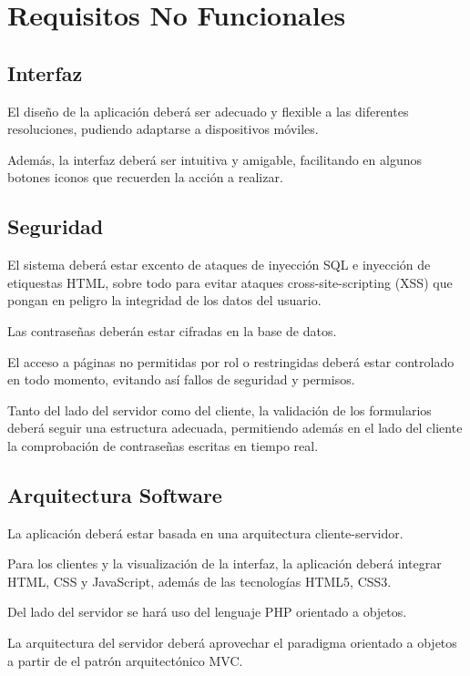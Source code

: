 \chapter{Requisitos No Funcionales}


\section{Interfaz}

El dise\~{n}o de la aplicaci\'{o}n deber\'{a} ser adecuado y flexible a las diferentes resoluciones, pudiendo adaptarse a dispositivos m\'{o}viles.

Adem\'{a}s, la interfaz deber\'{a} ser intuitiva y amigable, facilitando en algunos botones iconos que recuerden la acci\'{o}n a realizar.


\section{Seguridad}

El sistema deber\'{a} estar excento de ataques de inyecci\'{o}n SQL e inyecci\'{o}n de etiquestas HTML, sobre todo para evitar ataques cross-site-scripting (XSS) que pongan en peligro la integridad de los datos del usuario.

Las contrase\~{n}as deber\'{a}n estar cifradas en la base de datos.

El acceso a p\'{a}ginas no permitidas por rol o restringidas deber\'{a} estar controlado en todo momento, evitando as\'{i} fallos de seguridad y permisos.

Tanto del lado del servidor como del cliente, la validaci\'{o}n de los formularios deber\'{a} seguir una estructura adecuada, permitiendo adem\'{a}s en el lado del cliente la comprobaci\'{o}n de contrase\~{n}as escritas en tiempo real.


\section{Arquitectura Software}

La aplicaci\'{o}n deber\'{a} estar basada en una arquitectura cliente-servidor.

Para los clientes y la visualizaci\'{o}n de la interfaz, la aplicaci\'{o}n deber\'{a} integrar HTML, CSS y JavaScript, adem\'{a}s de las tecnolog\'{i}as HTML5, CSS3.

Del lado del servidor se har\'{a} uso del lenguaje PHP orientado a objetos.

La arquitectura del servidor deber\'{a} aprovechar el paradigma orientado a objetos a partir de el patr\'{o}n arquitect\'{o}nico MVC.

